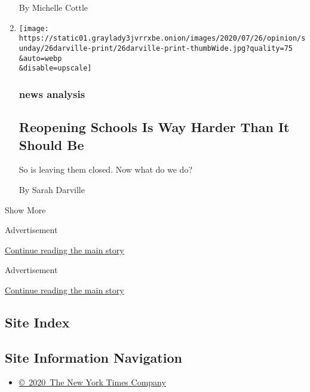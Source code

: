 \begin{enumerate}
  By Michelle Cottle
\item
  \href{/2020/07/23/sunday-review/reopening-schools-coronavirus.html}{}

  \texttt{[image: https://static01.graylady3jvrrxbe.onion/images/2020/07/26/opinion/sunday/26darville-print/26darville-print-thumbWide.jpg?quality=75\\\&auto=webp\\\&disable=upscale]}

  \hypertarget{news-analysis}{%
  \subsubsection{news analysis}\label{news-analysis}}

  \hypertarget{reopening-schools-is-way-harder-than-it-should-be}{%
  \subsection{Reopening Schools Is Way Harder Than It Should
  Be}\label{reopening-schools-is-way-harder-than-it-should-be}}

  So is leaving them closed. Now what do we do?

  By Sarah Darville
\end{enumerate}

Show More

Advertisement

\protect\hyperlink{after-mid1}{Continue reading the main story}

Advertisement

\protect\hyperlink{after-mktg}{Continue reading the main story}

\hypertarget{site-index}{%
\subsection{Site Index}\label{site-index}}

\hypertarget{site-information-navigation}{%
\subsection{Site Information
Navigation}\label{site-information-navigation}}

\begin{itemize}
\tightlist
\item
  \href{https://help.nytimes3xbfgragh.onion/hc/en-us/articles/115014792127-Copyright-notice}{©~2020~The
  New York Times Company}
\end{itemize}

